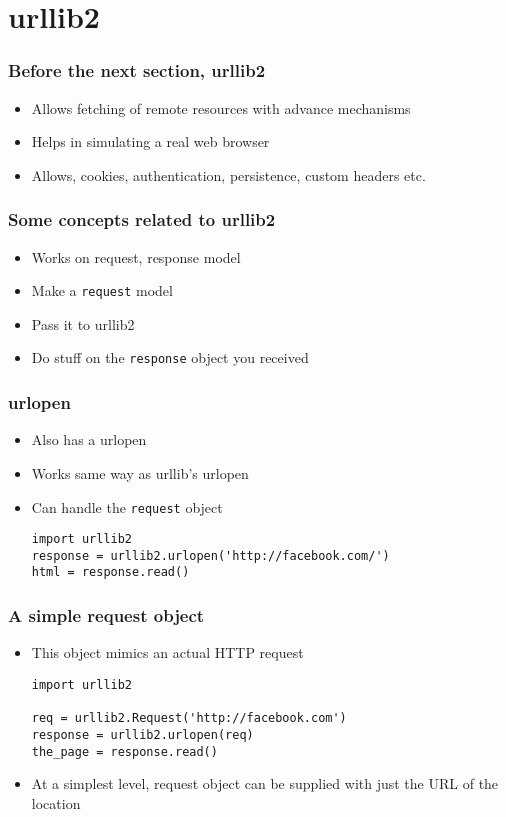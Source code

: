 \documentclass{beamer}
\begin{document}
\section{urllib2}
\label{sec-8}
\begin{frame}
\frametitle{Before the next section, urllib2}
\label{sec-8_1}


\begin{itemize}
\item Allows fetching of remote resources with advance mechanisms
\item Helps in simulating a real web browser
\item Allows, cookies, authentication, persistence, custom headers etc.
\end{itemize}
\end{frame}
\begin{frame}
\frametitle{Some concepts related to urllib2}
\label{sec-8_2}


\begin{itemize}
\item Works on request, response model
\item Make a \texttt{request} model
\item Pass it to urllib2
\item Do stuff on the \texttt{response} object you received
\end{itemize}
\end{frame}
\begin{frame}[fragile]
\frametitle{urlopen}
\label{sec-8_3}


\begin{itemize}
\item Also has a urlopen
\item Works same way as urllib's urlopen
\item Can handle the \texttt{request} object
     
\begin{verbatim}
import urllib2
response = urllib2.urlopen('http://facebook.com/')
html = response.read()
\end{verbatim}
\end{itemize}
\end{frame}
\begin{frame}[fragile]
\frametitle{A simple request object}
\label{sec-8_4}


\begin{itemize}
\item This object mimics an actual HTTP request
\begin{verbatim}
import urllib2

req = urllib2.Request('http://facebook.com')
response = urllib2.urlopen(req)
the_page = response.read()
\end{verbatim}
\item At a simplest level, request object can be supplied with just the URL of the location
\end{itemize}
\end{frame}
\end{document}
